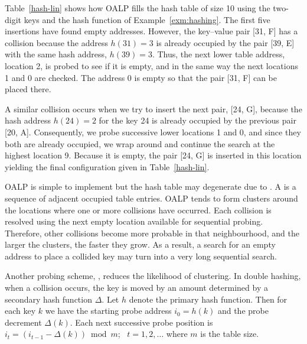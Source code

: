 \begin{Example}\label{exm:lin:probing}
Table~\ref{hash-lin} shows how OALP fills the hash table 
of size 10 using the two-digit keys and the hash function
of Example~\ref{exm:hashing}. The first five insertions have found
empty addresses. However, the key--value 
pair [31, F] has a collision because the address 
\(h(31) = 3\) is already occupied by the pair [39, E] with the same
hash address, \(h(39) = 3\). Thus, the 
next lower table address, location 2, is probed to see if
it is empty, and in the same way the next locations 1
and 0 are checked. The address 0 is empty so that the pair [31, F]
can be placed there. 

A similar collision occurs when we try to insert the next
pair, [24, G], because the hash address \(h(24)=2\) for
the key 24 is already occupied by the previous pair [20, A]. 
Consequently,  we probe successive lower locations 1 and 0, and 
since they both are already
occupied, we wrap around and continue the search at the highest
location 9. Because it is empty, the pair [24, G] is inserted in this location 
yielding the final configuration given in Table~\ref{hash-lin}.
\end{Example}

OALP is simple to implement but the hash table may degenerate due to
. A  is a
sequence of adjacent occupied table entries. OALP tends to form clusters 
around the locations
where one or more collisions have occurred. Each
collision is resolved using the next empty location 
available for sequential probing. Therefore, other collisions 
become more probable in that neighbourhood, and the larger the
clusters, the faster they grow. As a result,
a search for an empty address to place a collided key may
turn into a very long sequential search. 

Another probing scheme, , reduces the 
likelihood of clustering. In double hashing, when a collision occurs, the key
is moved by an amount determined by a secondary hash function \(\Delta\).  Let \(h\) denote
the primary hash function. Then for each key \(k\) we have the starting probe 
address \(i_{0} = h(k)\) and the probe decrement \(\Delta(k)\). Each
next successive probe position is 
\(i_{t} = ( i_{t-1} - \Delta(k) ) \bmod m\); \
\(t=1,2,\ldots\) where $m$ is the table size.

